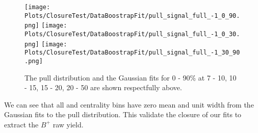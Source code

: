 \clearpage

\begin{figure}[h]
\begin{center}
\texttt{[image: Plots/ClosureTest/DataBoostrapFit/pull\_signal\_full\_-1\_0\_90.png]}
\texttt{[image: Plots/ClosureTest/DataBoostrapFit/pull\_signal\_full\_-1\_0\_30.png]}
\texttt{[image: Plots/ClosureTest/DataBoostrapFit/pull\_signal\_full\_-1\_30\_90.png]}
\caption{The pull distribution and the Gaussian fits for 0 - 90\% at 7 - 10, 10 - 15, 15 - 20, 20 - 50 are shown respectfully above.} 
\label{fig:closurepullcent} 
\end{center}
\end{figure}



We can see that all \pt and centrality bins have zero mean and unit width from the Gaussian fits to the pull distribution. This validate the closure of our fits to extract the $B^+$ raw yield. 




\clearpage
